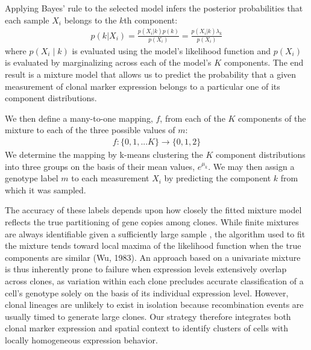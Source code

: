 \documentclass[10pt,letterpaper]{article}
\begin{document}
Applying Bayes' rule to the selected model infers the posterior probabilities that each sample $X_i$ belongs to the $k$th component:
\begin{eqnarray}
p(k|X_i) = \frac{p(X_i | k) p(k)}{p(X_i)} = \frac{p(X_i | k) \lambda_k}{p(X_i)}
\end{eqnarray}
where $p(X_i \mid k)$ is evaluated using the model's likelihood function and $p(X_i)$ is evaluated by marginalizing across each of the model's $K$ components. The end result is a mixture model that allows us to predict the probability that a given measurement of clonal marker expression belongs to a particular one of its component distributions.

We then define a many-to-one mapping, $f$, from each of the $K$ components of the mixture to each of the three possible values of $m$:
\begin{eqnarray}
f: \{0,1,...K\} \to \{0,1,2\}
\end{eqnarray}
We determine the mapping by k-means clustering the $K$ component distributions into three groups on the basis of their mean values, $e^{\mu_k}$. We may then assign a genotype label $m$ to each measurement $X_i$ by predicting the component $k$ from which it was sampled. 

The accuracy of these labels depends upon how closely the fitted mixture model reflects the true partitioning of gene copies among clones. While finite mixtures are always identifiable given a sufficiently large sample \cite{Teicher1963}, the algorithm used to fit the mixture tends toward local maxima of the likelihood function when the true components are similar (Wu, 1983). An approach based on a univariate mixture is thus inherently prone to failure when expression levels extensively overlap across clones, as variation within each clone precludes accurate classification of a cell's genotype solely on the basis of its individual expression level. However, clonal lineages are unlikely to exist in isolation because recombination events are usually timed to generate large clones. Our strategy therefore integrates both clonal marker expression and spatial context to identify clusters of cells with locally homogeneous expression behavior.
\end{document}

